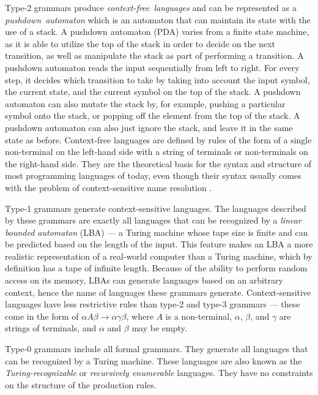 \documentclass[english,bachelors,forcepolishlogotype]{wizthesis}
\begin{document}
Type-2 grammars produce \emph{context-free~languages} and can be represented as
a \emph{pushdown~automaton} which is an automaton that can maintain its state
with the use of a stack. A pushdown automaton (PDA) varies from a finite state
machine, as it is able to utilize the top of the stack in order to decide on the
next transition, as well as manipulate the stack as part of performing a
transition. A pushdown automaton reads the input sequentially from left to
right. For every step, it decides which transition to take by taking into
account the input symbol, the current state, and the current symbol on the top
of the stack. A pushdown automaton can also mutate the stack by, for example,
pushing a particular symbol onto the stack, or popping off the element from the
top of the stack. A pushdown automaton can also just ignore the stack, and leave
it in the same state as before. Context-free languages are defined by rules of
the form of a single non-terminal on the left-hand side with a string of
terminals or non-terminals on the right-hand side. They are the theoretical
basis for the syntax and structure of most programming languages of today, even
though their syntax usually comes with the problem of context-sensitive name
resolution \cite{hopcroft-2005}.

Type-1 grammars generate context-sensitive languages. The languages described by
these grammars are exactly all languages that can be recognized by a
\emph{linear bounded automaton} (LBA) --- a Turing machine whose tape size is
finite and can be predicted based on the length of the input. This feature makes
an LBA a more realistic representation of a real-world computer than a Turing
machine, which by definition has a tape of infinite length. Because of the
ability to perform random access on its memory, LBAs can generate languages
based on an arbitrary context, hence the name of languages these grammars
generate. Context-sensitive languages have less restrictive rules than type-2
and type-3 grammars --- these come in the form of $\alpha A \beta \rightarrow
\alpha \gamma \beta$, where $A$ is a non-terminal, $\alpha$, $\beta$, and
$\gamma$ are strings of terminals, and $\alpha$ and $\beta$ may be empty.

Type-0 grammars include all formal grammars. They generate all languages that
can be recognized by a Turing machine. These languages are also known as the
\emph{Turing-recognizable} or \emph{recursively enumerable} languages. They have
no constraints on the structure of the production rules.
\end{document}
